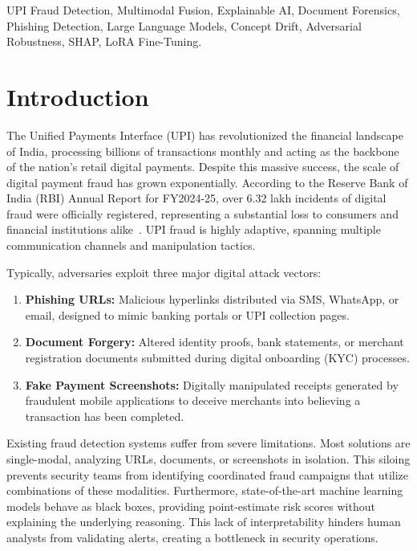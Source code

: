 \documentclass[journal]{IEEEtran}
\begin{document}
\begin{IEEEkeywords}
UPI Fraud Detection, Multimodal Fusion, Explainable AI, Document Forensics, Phishing Detection, Large Language Models, Concept Drift, Adversarial Robustness, SHAP, LoRA Fine-Tuning.
\end{IEEEkeywords}

\section{Introduction}
\label{sec:intro}
The Unified Payments Interface (UPI) has revolutionized the financial landscape of India, processing billions of transactions monthly and acting as the backbone of the nation's retail digital payments. Despite this massive success, the scale of digital payment fraud has grown exponentially. According to the Reserve Bank of India (RBI) Annual Report for FY2024-25, over 6.32 lakh incidents of digital fraud were officially registered, representing a substantial loss to consumers and financial institutions alike~\cite{rbi_report, rbi2024}. UPI fraud is highly adaptive, spanning multiple communication channels and manipulation tactics.

Typically, adversaries exploit three major digital attack vectors:
\begin{enumerate}
    \item \textbf{Phishing URLs:} Malicious hyperlinks distributed via SMS, WhatsApp, or email, designed to mimic banking portals or UPI collection pages.
    \item \textbf{Document Forgery:} Altered identity proofs, bank statements, or merchant registration documents submitted during digital onboarding (KYC) processes.
    \item \textbf{Fake Payment Screenshots:} Digitally manipulated receipts generated by fraudulent mobile applications to deceive merchants into believing a transaction has been completed.
\end{enumerate}

Existing fraud detection systems suffer from severe limitations. Most solutions are single-modal, analyzing URLs, documents, or screenshots in isolation. This siloing prevents security teams from identifying coordinated fraud campaigns that utilize combinations of these modalities. Furthermore, state-of-the-art machine learning models behave as black boxes, providing point-estimate risk scores without explaining the underlying reasoning. This lack of interpretability hinders human analysts from validating alerts, creating a bottleneck in security operations.
\end{document}
